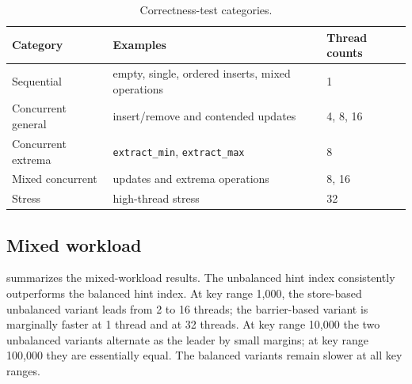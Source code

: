 \documentclass[a4paper,11pt]{article}
\newcommand{\code}[1]{\texttt{#1}}
\begin{document}
\begin{table}[H]
\centering
\caption{Correctness-test categories.}
\label{tab:tests}
\begin{tabular}{lll}
\toprule
Category & Examples & Thread counts \\
\midrule
Sequential & empty, single, ordered inserts, mixed operations & 1 \\
Concurrent general & insert/remove and contended updates & 4, 8, 16 \\
Concurrent extrema & \code{extract\_min}, \code{extract\_max} & 8 \\
Mixed concurrent & updates and extrema operations & 8, 16 \\
Stress & high-thread stress & 32 \\
\bottomrule
\end{tabular}
\end{table}

\subsection{Mixed workload}

 summarizes the mixed-workload results. The unbalanced hint index consistently outperforms the balanced hint index. At key range 1,000, the store-based unbalanced variant leads from 2 to 16 threads; the barrier-based variant is marginally faster at 1 thread and at 32 threads. At key range 10,000 the two unbalanced variants alternate as the leader by small margins; at key range 100,000 they are essentially equal. The balanced variants remain slower at all key ranges.
\end{document}

